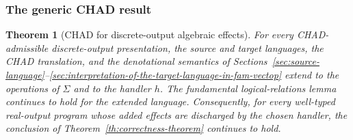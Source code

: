 \documentclass[11pt,a4paper]{article}
\newtheorem{theorem}{Theorem}[section]
\theoremstyle{definition}
\theoremstyle{remark}
\begin{document}
\subsubsection{The generic CHAD result}

\begin{theorem}[CHAD for discrete-output algebraic effects]
  \label{th:appendix-generic-discrete-output-chad}
  For every CHAD-admissible discrete-output presentation, the source and target
  languages, the CHAD translation, and the denotational semantics of
  Sections~\ref{sec:source-language}--\ref{sec:interpretation-of-the-target-language-in-fam-vectop}
  extend to the operations of \(\Sigma\) and to the handler \(h\).  The
  fundamental logical-relations lemma continues to hold for the extended
  language.  Consequently, for every well-typed real-output program whose added
  effects are discharged by the chosen handler, the conclusion of
  Theorem~\ref{th:correctness-theorem} continues to hold.
\end{theorem}
\end{document}
